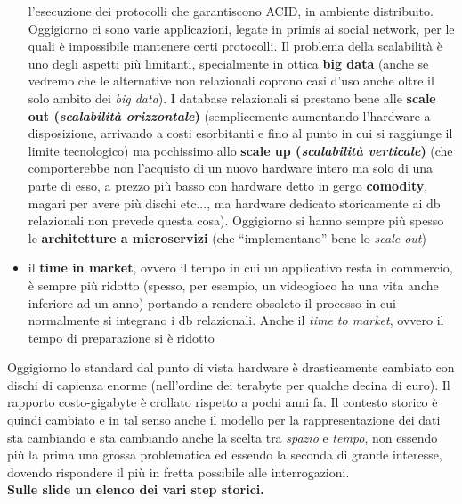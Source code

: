 \documentclass[a4paper,12pt, oneside]{book}
\begin{document}
\begin{itemize}
  l'esecuzione dei protocolli che garantiscono ACID, in ambiente
  distribuito. Oggigiorno ci sono varie applicazioni, legate in primis ai social
  network, per le quali è impossibile mantenere certi protocolli. Il problema
  della scalabilità è uno degli aspetti più limitanti, specialmente in ottica
  \textbf{big data} (anche se vedremo che le alternative non relazionali coprono
  casi d'uso anche oltre il solo ambito dei \textit{big data}). I database
  relazionali si prestano bene alle \textbf{scale out (\textit{scalabilità
      orizzontale})} (semplicemente aumentando
  l'hardware a disposizione, arrivando a costi esorbitanti e fino al punto in
  cui si raggiunge il limite tecnologico) ma pochissimo allo \textbf{scale up
    (\textit{scalabilità verticale})} (che comporterebbe non l'acquisto di un
  nuovo hardware intero ma solo di una parte di esso, a prezzo più basso con
  hardware detto in gergo \textbf{comodity},
  magari per avere più dischi etc$\ldots$, ma hardware dedicato storicamente ai
  db relazionali non prevede questa cosa). Oggigiorno si hanno sempre più spesso
  le \textbf{architetture a microservizi} (che ``implementano'' bene lo
  \textit{scale out})
  \item il \textbf{time in market}, ovvero il tempo in cui un applicativo resta
  in commercio, è sempre più ridotto (spesso, per esempio, un videogioco ha una
  vita anche inferiore ad un anno) portando a rendere obsoleto il processo in
  cui normalmente si integrano i db relazionali. Anche il \textit{time to
    market}, ovvero il tempo di preparazione si è ridotto
\end{itemize}
Oggigiorno lo standard dal punto di vista hardware è drasticamente cambiato con
dischi di capienza enorme (nell'ordine dei terabyte per qualche decina di euro).
Il rapporto costo-gigabyte è crollato rispetto a pochi anni fa. Il contesto
storico è quindi cambiato e in tal senso anche il modello per la
rappresentazione dei dati sta cambiando e sta cambiando anche la scelta tra
\textit{spazio} e \textit{tempo}, non essendo più la prima una grossa
problematica ed essendo la seconda di grande interesse, dovendo rispondere il
più in fretta possibile alle interrogazioni.\\
\textbf{Sulle slide un elenco dei vari step storici.}
\end{document}
